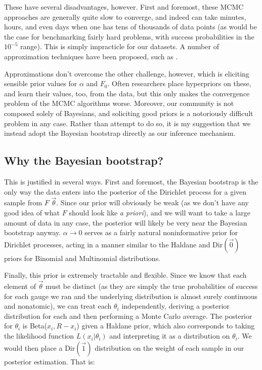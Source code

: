 These have several disadvantages, however. First and foremost, these MCMC approaches are generally quite slow to converge, and indeed can take minutes, hours, and even days when one has tens of thousands of data points (as would be the case for benchmarking fairly hard problems, with success probabilities in the $10^{-5}$ range). This is simply impracticle for our datasets. A number of approximation techniques have been proposed, such as \cite{Wang2011}.

Approximations don't overcome the other challenge, however, which is eliciting sensible prior values for $\alpha$ and $F_0$. Often researchers place hyperpriors on these, and learn their values, too, from the data, but this only makes the convergence problem of the MCMC algorithms worse. Moreover, our community is not composed solely of Bayesians, and soliciting good priors is a notoriously difficult problem in any case. Rather than attempt to do so, it is my suggestion that we instead adopt the Bayesian bootstrap directly as our inference mechanism.

\subsection{Why the Bayesian bootstrap?}

This is justified in several ways. First and foremost, the Bayesian bootstrap is the only way the data enters into the posterior of the Dirichlet process for a given sample from $F$ $\vec\theta$. Since our prior will obviously be weak (as we don't have any good idea of what $F$ should look like \emph{a priori}), and we will want to take a large amount of data in any case, the posterior will  likely be very near the Bayesian bootstrap anyway. $\alpha\rightarrow 0$ serves as a fairly natural noninformative prior for Dirichlet processes, acting in a manner similar to the Haldane and Dir$(\vec 0)$ priors for Binomial and Multinomial distributions.

Finally, this prior is extremely tractable and flexible. Since we know that each element of $\vec \theta$ must be distinct (as they are simply the true probabilities of success for each gauge we ran and the underlying distribution is almost surely continuous and nonatomic), we can treat each $\theta_i$ independently, deriving a posterior distribution for each and then performing a Monte Carlo average. The posterior for $\theta_i$ is Beta($x_i,R-x_i$) given a Haldane prior, which also corresponds to taking the likelihood function $L(x_i|\theta_i)$ and interpreting it as a distribution on $\theta_i$. We would then place a Dir$(\vec{1})$ distribution on the weight of each sample in our posterior estimation. That is:

